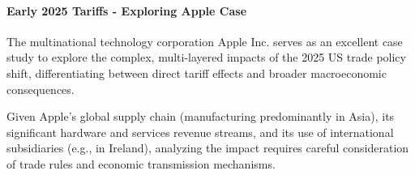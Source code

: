 \paragraph{Early 2025 Tariffs - Exploring Apple Case} \label{par:case_study_apple}
The multinational technology corporation Apple Inc. serves as an excellent case study to explore the complex, multi-layered impacts of the 2025 US trade policy shift, differentiating between direct tariff effects and broader macroeconomic consequences.

Given Apple's global supply chain (manufacturing predominantly in Asia), its significant hardware and services revenue streams, and its use of international subsidiaries (e.g., in Ireland), analyzing the impact requires careful consideration of trade rules and economic transmission mechanisms.

